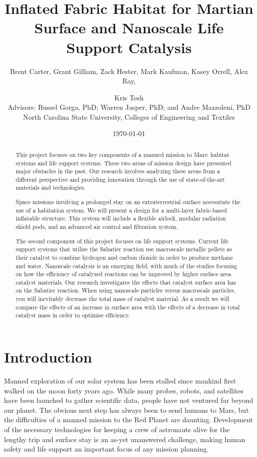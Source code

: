 \documentclass[12pt,letterpaper,oneside,twocolumn]{article}
\title{Inflated Fabric Habitat for Martian Surface and Nanoscale Life Support Catalysis} %
\date{\today}
\author{Brent Carter, Grant Gilliam, Zack Hester, Mark Kaufman, Kasey Orrell, Alex Ray, \and Kris Tesh\\ Advisors: Russel Gorga, PhD; Warren Jasper, PhD; and Andre Mazzoleni, PhD\\ North Carolina State University, Colleges of Engineering and Textiles}
\begin{document}
\maketitle

\begin{abstract}
This project focuses on two key components of a manned mission to Mars: habitat systems and life support systems. These two areas of mission design have presented major obstacles in the past. Our research involves analyzing these areas from a different perspective and providing innovation through the use of state-of-the-art materials and technologies.

Space missions involving a prolonged stay on an extraterrestrial surface necessitate the use of a habitation system. We will present a design for a multi-layer fabric-based inflatable structure. This system will include a flexible airlock, modular radiation shield pods, and an advanced air control and filtration system. 

The second component of this project focuses on life support systems.  Current life support systems that utilise the Sabatier reaction use macroscale metallic pellets as their catalyst to combine hydrogen and carbon dioxide in order to produce methane and water. Nanoscale catalysis is an emerging field, with much of the studies focusing on how the efficiency of catalyzed reactions can be improved by higher surface area catalyst materials. Our research investigates the effects that catalyst surface area has on the Sabatier reaction. When using nanoscale particles versus macroscale particles, you will inevitably decrease the total mass of catalyst material. As a result we will compare the effects of an increase in surface area with the effects of a decrease in total catalyst mass in order to optimise efficiency.
\end{abstract}

\section{Introduction}
Manned exploration of our solar system has been stalled since mankind first walked on the moon forty years ago. While many probes, robots, and satellites have been launched to gather scientific data, people have not ventured far beyond our planet. The obvious next step has always been to send humans to Mars, but the difficulties of a manned mission to the Red Planet are daunting. Development of the necessary technologies for keeping a crew of astronauts alive for the lengthy trip and surface stay is an as-yet unanswered challenge, making human safety and life support an important focus of any mission planning.
\end{document}

